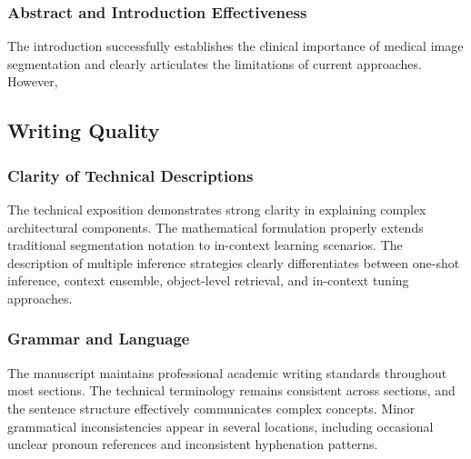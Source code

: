 \subsubsection{Abstract and Introduction Effectiveness}
 The introduction successfully establishes the clinical importance of medical image segmentation and clearly articulates the limitations of current approaches. However, 

\subsection{Writing Quality}
\subsubsection{Clarity of Technical Descriptions}
The technical exposition demonstrates strong clarity in explaining complex architectural components.  The mathematical formulation properly extends traditional segmentation notation to in-context learning scenarios. The description of multiple inference strategies clearly differentiates between one-shot inference, context ensemble, object-level retrieval, and in-context tuning approaches.


\subsubsection{Grammar and Language}
The manuscript maintains professional academic writing standards throughout most sections. The technical terminology remains consistent across sections, and the sentence structure effectively communicates complex concepts. Minor grammatical inconsistencies appear in several locations, including occasional unclear pronoun references and inconsistent hyphenation patterns. 

